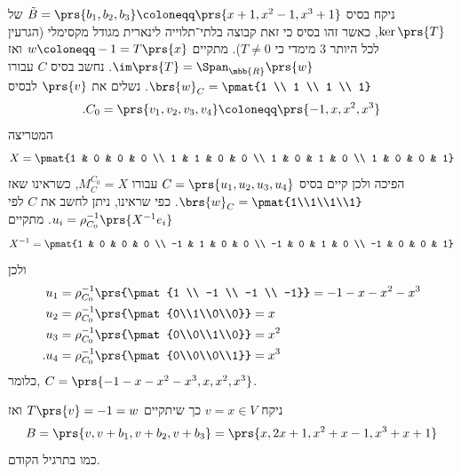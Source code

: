 \documentclass[a4paper,10pt,twoside,openany]{book}
\begin{document}
\begin{solution}
ניקח בסיס
$\tilde{B} = \prs{b_1, b_2, b_3} \coloneqq \prs{x + 1, x^2 - 1, x^3 + 1}$
של
$\ker\prs{T}$,
כאשר זהו בסיס כי זאת קבוצה בלתי־תלוייה לינארית מגודל מקסימלי (הגרעין לכל היותר $3$ מימדי כי
$T \neq 0$).
מתקיים
$w \coloneqq -1 = T\prs{x}$
ואז
$\im\prs{T} = \Span_{\mbb{R}}\prs{w}$.
נחשב בסיס
$C$
עבורו
$\brs{w}_C = \pmat{1 \\ 1 \\ 1 \\ 1}$.
נשלים את
$\prs{v}$
לבסיס
\[\text{.} C_0 = \prs{v_1,v_2,v_3,v_4} \coloneqq \prs{-1,x,x^2,x^3}\]
המטריצה
\[X = \pmat{1 & 0 & 0 & 0 \\ 1 & 1 & 0 & 0 \\ 1 & 0 & 1 & 0 \\ 1 & 0 & 0 & 1}\]
הפיכה ולכן קיים בסיס
$C = \prs{u_1, u_2, u_3, u_4}$
עבורו
$M^{C_0}_C = X$,
כשראינו שאז
$\brs{w}_C = \pmat{1\\1\\1\\1}$.
כפי שראינו, ניתן לחשב את
$C$
לפי
$u_i = \rho_{C_0}^{-1}\prs{X^{-1} e_i}$.
מתקיים
\[X^{-1} = \pmat{1 & 0 & 0 & 0 \\ -1 & 1 & 0 & 0 \\ -1 & 0 & 1 & 0 \\ -1 & 0 & 0 & 1}\]
ולכן
\begin{align*}
u_1 &= \rho_{C_0}^{-1} \prs{\pmat{1 \\ -1 \\ -1 \\ -1}} = -1 -x - x^2 - x^3 \\
u_2 &= \rho_{C_0}^{-1} \prs{\pmat{0\\1\\0\\0}} = x \\
u_3 &= \rho_{C_0}^{-1} \prs{\pmat{0\\0\\1\\0}} = x^2 \\
\text{.} u_4 &= \rho_{C_0}^{-1} \prs{\pmat{0\\0\\0\\1}} = x^3
\end{align*}
כלומר,
$C = \prs{-1-x-x^2-x^3, x, x^2, x^3}$.

ניקח
$v = x \in V$
כך שיתקיים
$T\prs{v} = -1 = w$
ואז
\[B = \prs{v, v+b_1, v+b_2, v+b_3} = \prs{x, 2x+1, x^2+x-1, x^3 + x + 1}\]
כמו בתרגיל הקודם.


\end{solution}
\end{document}
